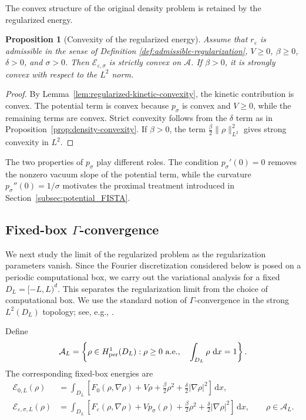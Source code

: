\documentclass[11pt]{article}
\newcommand{\A}{\mathcal{A}}
\newcommand{\E}{\mathcal{E}}
\newcommand{\dd}{\,\mathrm{d}}
\newcommand{\eps}{\varepsilon}
\newcommand{\sig}{\sigma}
\theoremstyle{plain}
\newtheorem{proposition}[theorem]{Proposition}
\theoremstyle{definition}
\numberwithin{equation}{section}
\begin{document}
The convex structure of the original density problem is retained by
the regularized energy.

\begin{proposition}[Convexity of the regularized energy]
\label{prop:joint-convexity}
Assume that $r_\eps$ is admissible in the sense of Definition \ref{def:admissible-regularization}, $V\ge0$, $\beta\ge0$,
$\delta>0$, and $\sig>0$.
Then $\E_{\eps,\sig}$ is strictly convex on $\A$.
If $\beta>0$, it is strongly convex with respect to the $L^2$ norm.
\end{proposition}

\begin{proof}
By Lemma~\ref{lem:regularized-kinetic-convexity}, the kinetic
contribution is convex. The potential term is convex because
$p_\sig$ is convex and $V\ge0$, while the remaining terms are convex.
Strict convexity follows from the $\delta$ term as in
Proposition~\ref{prop:density-convexity}. If $\beta>0$, the term
$\frac{\beta}{2}\|\rho\|_{L^2}^2$ gives strong convexity in $L^2$.
\end{proof}

The two properties of $p_\sig$ play different roles.
The condition $p_\sig'(0)=0$ removes the nonzero vacuum slope of the
potential term, while the curvature $p_\sig''(0)=1/\sig$ motivates
the proximal treatment introduced in Section~\ref{subsec:potential_FISTA}.


\subsection{Fixed-box $\Gamma$-convergence}

We next study the limit of the regularized problem as the
regularization parameters vanish. Since the Fourier discretization
considered below is posed on a periodic computational box, we carry
out the variational analysis for a fixed
$D_L=[-L,L)^d$. This separates the regularization limit from the
choice of computational box.
We use the standard notion of $\Gamma$-convergence in the strong
$L^2(D_L)$ topology; see, e.g., \cite{Braides2002}.

Define
\begin{equation}
\label{eq:admissible-density-box}
\A_L
=
\left\{
\rho\in H^1_{\rm per}(D_L):
\rho\ge0\ {\rm a.e.},
\quad
\int_{D_L}\rho\,\dd x=1
\right\}.
\end{equation}
The corresponding fixed-box energies are
\begin{equation}
\label{eq:fixed-box-energies}
\begin{aligned}
\E_{0,L}(\rho)
&=
\int_{D_L}
\left[
F_0(\rho,\nabla\rho)
+V\rho
+\frac{\beta}{2}\rho^2
+\frac{\delta}{2}|\nabla\rho|^2
\right]\dd x,\\
\E_{\eps,\sig,L}(\rho)
&=
\int_{D_L}
\left[
F_\eps(\rho,\nabla\rho)
+Vp_\sig(\rho)
+\frac{\beta}{2}\rho^2
+\frac{\delta}{2}|\nabla\rho|^2
\right]\dd x,
\qquad
\rho\in\A_L.
\end{aligned}
\end{equation}
\end{document}

